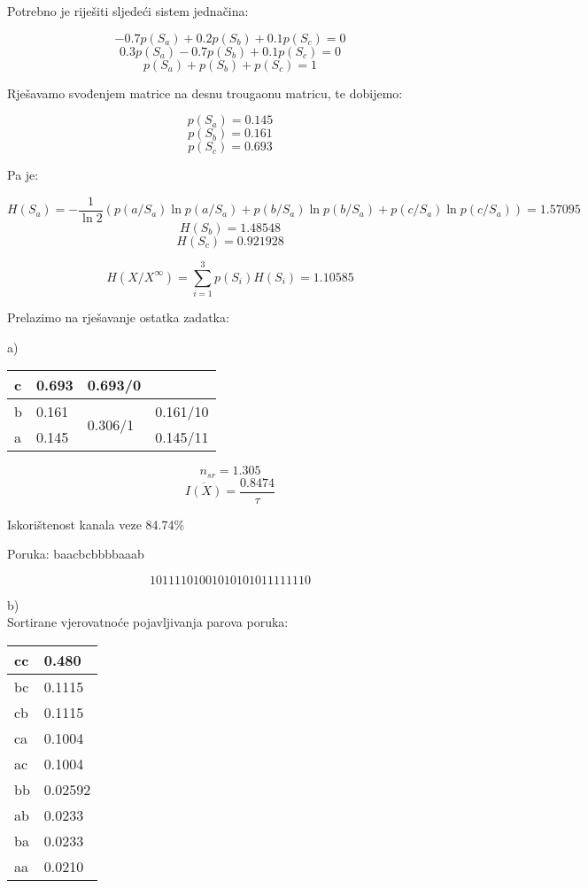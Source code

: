 \documentclass[12pt]{article}
\begin{document}
Potrebno je riješiti sljedeći sistem jednačina:

$$-0.7 p(S_a) + 0.2p(S_b) + 0.1p(S_c) = 0$$
$$0.3p(S_a) - 0.7p(S_b) + 0.1p(S_c) = 0$$
$$p(S_a) + p(S_b) + p(S_c) = 1$$

Rješavamo svođenjem matrice na desnu trougaonu matricu, te dobijemo:

$$p(S_a) = 0.145$$
$$p(S_b) = 0.161$$
$$p(S_c) = 0.693$$

Pa je:

$$H(S_a) = - \frac{1}{\ln{2}} (p(a/S_a) \ln{p(a/S_a)} + p(b/S_a) \ln{p(b/S_a)} + p(c/S_a) \ln{p(c/S_a)}) = 1.57095$$
$$H(S_b) = 1.48548$$
$$H(S_c) = 0.921928$$

$$H(X/X^{\infty}) = \sum_{i = 1}^{3} p(S_i)H(S_i) = 1.10585$$

Prelazimo na rješavanje ostatka zadatka:

\newpage
a)\\

\begin{table}[hp]
\centering
\begin{tabular}{|l|l|l|l}
\cline{1-3}
c & 0.693 & 0.693/0 &  \\ \hline
b & 0.161 & \multirow{2}{*}{0.306/1} & \multicolumn{1}{l|}{0.161/10} \\ \cline{1-2} \cline{4-4} 
a & 0.145 &  & \multicolumn{1}{l|}{0.145/11} \\ \hline
\end{tabular}
\end{table}

$$n_{sr} = 1.305$$
$$\overline{I(X)} = \frac{0.8474}{\tau}$$

Iskorištenost kanala veze 84.74\%

Poruka: baacbcbbbbaaab

$$10111101001010101011111110$$

\newpage
b)\\

Sortirane vjerovatnoće pojavljivanja parova poruka:

\begin{table}[hp]
\centering
\begin{tabular}{|l|l|}
\hline
cc & 0.480 \\ \hline
bc & 0.1115 \\ \hline
cb & 0.1115 \\ \hline
ca & 0.1004 \\ \hline
ac & 0.1004 \\ \hline
bb & 0.02592 \\ \hline
ab & 0.0233 \\ \hline
ba & 0.0233 \\ \hline
aa & 0.0210 \\ \hline
\end{tabular}
\end{table}
\end{document}
